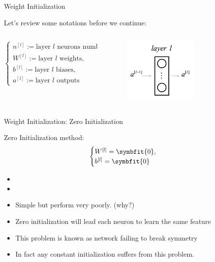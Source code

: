 \begin{frame}{Weight Initialization}
	\begin{block}{Let's review some notations before we continue:}
		\begin{columns}
			\begin{column}{0.4\textwidth}
				\[
				\begin{cases}
					n^{[l]} := \text{layer $l$ neurons number}, \\
					W^{[l]} := \text{layer $l$ weights},\\
					b^{[l]} := \text{layer $l$ biases}, \\
					a^{[l]} := \text{layer $l$ outputs}
				\end{cases}
				\]
			\end{column}\hfill
			\begin{column}{0.4\textwidth}
				\begin{figure}[H]
					\centering
					\includegraphics[width=0.65\textwidth]{Images/layer.png}
				\end{figure}
			\end{column}
		\end{columns}
	\end{block}
\end{frame}

\begin{frame}{Weight Initialization: Zero Initialization}
	\begin{block}{Zero Initialization method:}
		\[
		\begin{cases}
			W^{[l]} = \symbfit{0},\\
			b^{[l]} = \symbfit{0}
		\end{cases}
		\]
	\end{block}
	\begin{itemize}
		\item[]
		\item[]
		\item Simple but perform very poorly. (why?)
		\pause
		\item Zero initialization will lead each neuron to learn the same feature
		\item This problem is known as network {\color{red}failing to break symmetry}
		\item In fact any constant initialization suffers from this problem.
	\end{itemize}
\end{frame}

